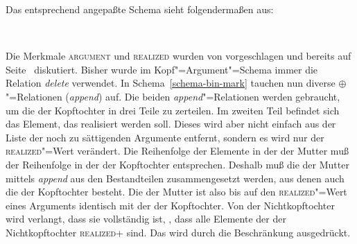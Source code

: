 {Das entsprechend angepaßte Schema sieht folgendermaßen aus:
\begin{samepage}
\begin{schema}
\label{schema-bin-mark}
 \impl\\
\end{schema}
\end{samepage}

\noindent
Die Merkmale \textsc{argument} und \textsc{realized} wurden von \citet{Prze99} vorgeschlagen
und bereits auf Seite~\pageref{page-realized} diskutiert. Bisher wurde im Kopf"=Argument"=Schema
immer die Relation \emph{delete} verwendet. In Schema~\ref{schema-bin-mark} tauchen nun
diverse $\oplus$"=Relationen (\emph{append}) auf. Die beiden \emph{append}"=Relationen
werden gebraucht, um die \subcatl der Kopftochter in drei Teile zu zerteilen. Im zweiten
Teil befindet sich das Element, das realisiert werden soll. Dieses wird aber nicht einfach
aus der Liste der noch zu sättigenden Argumente entfernt, sondern es wird nur der 
\textsc{realized}"=Wert verändert. Die Reihenfolge der Elemente in der \subcatl der Mutter
muß der Reihenfolge in der \subcatl der Kopftochter entsprechen. Deshalb muß
die \subcatl der Mutter mittels \emph{append}
aus den Bestandteilen zusammengesetzt werden, aus denen auch die \subcatl der Kopftochter
besteht. Die \subcatl der Mutter ist also bis auf den \textsc{realized}"=Wert eines Arguments
identisch mit der \subcatl der Kopftochter. Von der Nichtkopftochter wird verlangt, dass sie
vollständig ist, \dash, dass alle Elemente der \subcatl der Nichtkopftochter \textsc{realized}+
sind. Das wird durch die Beschränkung  ausgedrückt. 

}
